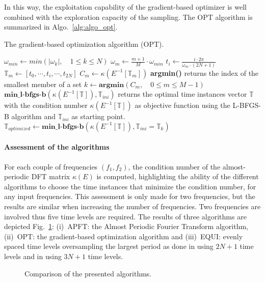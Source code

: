 In this way, the exploitation capability of the gradient-based
optimizer is well combined with the exploration capacity of the
sampling. The OPT algorithm is summarized in Algo.~\ref{alg:algo_opt}.
\begin{algorithm}[htb]
\caption{The gradient-based optimization algorithm (OPT).}
\label{alg:algo_opt}
\begin{algorithmic}
\STATE $\omega_{min} \leftarrow min \left( |\omega_k |,\quad 1 \leqslant k \leqslant N \right)$
    \STATE $\omega_m \leftarrow \frac{m + 1}{M} \cdot \omega_{min}$
        \STATE $t_i \leftarrow \displaystyle\frac{i \cdot 2 \pi}{\omega_m \cdot (2N + 1)}$
    \ENDFOR
    \STATE $\mathbb{T}_m \leftarrow [t_0, \cdots, t_i, \cdots, t_{2N}]$
    \STATE $C_m \leftarrow \kappa \left(E^{-1} \left[\mathbb{T}_m \right] \right)$
\ENDFOR
\STATE \textbf{argmin()} returns the index of the smallest member of a set
\STATE $k \leftarrow \textbf{argmin}\left(C_m,\quad 0\leqslant m \leqslant M-1\right)$
\STATE $\textbf{min\_l-bfgs-b}\left(\kappa \left(E^{-1} \left[\mathbb{T}\right]\right), \mathbb{T}_{ini}\right)$ returns the optimal 
time instances vector $\mathbb{T}$ with the condition number $\kappa\left(E^{-1} \left[\mathbb{T}\right]\right)$ as objective function 
using the L-BFGS-B algorithm and  $\mathbb{T}_{ini}$ as starting point.
\STATE $\mathbb{T}_{optimized} \leftarrow 
  \textbf{min\_l-bfgs-b}\left(\kappa\left(E^{-1} \left[\mathbb{T}\right]\right), \mathbb{T}_{ini}=\mathbb{T}_k\right)$
\end{algorithmic}
\end{algorithm}

\paragraph{Assessment of the algorithms}

For each couple of frequencies $(f_1, f_2)$, the condition number of the
almost-periodic DFT matrix $\kappa (E)$ is computed, highlighting
the ability of the different algorithms to choose the time instances that
minimize the condition number, for any input frequencies. This
assessment is only made for two frequencies, but the results are similar
when increasing the number of frequencies. Two frequencies are
involved thus five time levels are required. The results of three
algorithms are depicted Fig.~\ref{fig:bench_algo}: (i)~APFT: the
Almost Periodic Fourier Transform algorithm, (ii)~OPT: the
gradient-based optimization algorithm and (iii)~EQUI: evenly spaced
time levels oversampling the largest period as done in
\citet{Gopinath2007} using $2N+1$ time
levels and in \citet{Ekici2007, Ekici2008} using $3N+1$
time levels.
\begin{figure}[htb]
  \centering 
    \quad{}
  \caption{Comparison of the presented algorithms.}
  \label{fig:bench_algo}
\end{figure}


